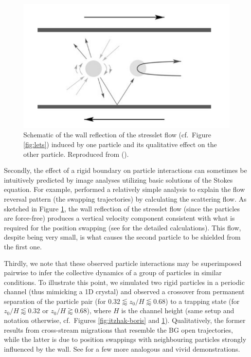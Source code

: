 \begin{figure}%
  \centering
  \includegraphics[width=0.55\columnwidth]{stresslet_reflection.png}
  \caption{Schematic of the wall reflection of the stresslet flow (cf.\ Figure \ref{fig:lets}) induced by one particle and its qualitative effect on the other particle. Reproduced from \cite{zurita-gotor_2007} ().}
  \label{fig:stresslet-refl}
\end{figure}

Secondly, the effect of a rigid boundary on particle interactions can sometimes be intuitively predicted by image analyses utilizing basic solutions of the Stokes equation.
For example, \cite{zurita-gotor_2007} performed a relatively simple analysis to explain the flow reversal pattern (\ie the swapping trajectories) by calculating the scattering flow.
As sketched in Figure \ref{fig:stresslet-refl}, the wall reflection of the stresslet flow (since the particles are force-free) produces a vertical velocity component consistent with what is required for the position swapping (see \cite{zurita-gotor_2007} for the detailed calculations). This flow, despite being very small, is what causes the second particle to be shielded from the first one.

Thirdly, we note that these observed particle interactions may be superimposed pairwise to infer the collective dynamics of a group of particles in similar conditions.
To illustrate this point, we simulated two rigid particles in a periodic channel (thus mimicking a 1D crystal) and observed a crossover from permanent separation of the particle pair (for $0.32 \lessapprox z_0/H \lessapprox 0.68$) to a trapping state (for $z_0/H \lessapprox 0.32$ or $z_0/H \gtrapprox 0.68$), where $H$ is the channel height (same setup and notation otherwise, cf.\ Figures \ref{fig:itzhak-boris} and \ref{fig:stresslet-refl}).
Qualitatively, the former results from cross-stream migrations that resemble the BG open trajectories, while the latter is due to position swappings with neighbouring particles strongly influenced by the wall.
See \cite{Beatus2006, Janssen2012, Uspal2013} for a few more analogous and vivid demonstrations.

